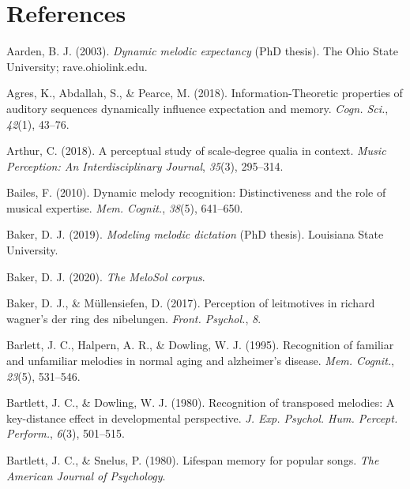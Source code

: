 \documentclass[english,man,floatsintext]{apa6}
\begin{document}
\hypertarget{references}{%
\section{References}\label{references}}

\begingroup
\setlength{\parindent}{-0.5in}
\setlength{\leftskip}{0.5in}

\hypertarget{refs}{}
\leavevmode\hypertarget{ref-Aarden2003-ib}{}%
Aarden, B. J. (2003). \emph{Dynamic melodic expectancy} (PhD thesis). The Ohio State University; rave.ohiolink.edu.

\leavevmode\hypertarget{ref-Agres2018-dw}{}%
Agres, K., Abdallah, S., \& Pearce, M. (2018). Information-Theoretic properties of auditory sequences dynamically influence expectation and memory. \emph{Cogn. Sci.}, \emph{42}(1), 43--76.

\leavevmode\hypertarget{ref-Arthur2018-my}{}%
Arthur, C. (2018). A perceptual study of scale-degree qualia in context. \emph{Music Perception: An Interdisciplinary Journal}, \emph{35}(3), 295--314.

\leavevmode\hypertarget{ref-Bailes2010-nh}{}%
Bailes, F. (2010). Dynamic melody recognition: Distinctiveness and the role of musical expertise. \emph{Mem. Cognit.}, \emph{38}(5), 641--650.

\leavevmode\hypertarget{ref-Baker2019-ij}{}%
Baker, D. J. (2019). \emph{Modeling melodic dictation} (PhD thesis). Louisiana State University.

\leavevmode\hypertarget{ref-Baker2020-pw}{}%
Baker, D. J. (2020). \emph{The MeloSol corpus}.

\leavevmode\hypertarget{ref-Baker2017-nt}{}%
Baker, D. J., \& Müllensiefen, D. (2017). Perception of leitmotives in richard wagner's der ring des nibelungen. \emph{Front. Psychol.}, \emph{8}.

\leavevmode\hypertarget{ref-Barlett1995-iw}{}%
Barlett, J. C., Halpern, A. R., \& Dowling, W. J. (1995). Recognition of familiar and unfamiliar melodies in normal aging and alzheimer's disease. \emph{Mem. Cognit.}, \emph{23}(5), 531--546.

\leavevmode\hypertarget{ref-Bartlett1980-yv}{}%
Bartlett, J. C., \& Dowling, W. J. (1980). Recognition of transposed melodies: A key-distance effect in developmental perspective. \emph{J. Exp. Psychol. Hum. Percept. Perform.}, \emph{6}(3), 501--515.

\leavevmode\hypertarget{ref-Bartlett1980-fc}{}%
Bartlett, J. C., \& Snelus, P. (1980). Lifespan memory for popular songs. \emph{The American Journal of Psychology}.
\end{document}
